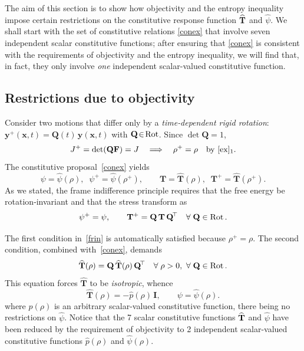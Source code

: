 The aim of this section is to show how objectivity and the entropy inequality impose
certain restrictions on the constitutive response function $\widehat{\mathbf{T}}$ and $\widehat{\psi}$. We shall start with the
set of constitutive relations \eqref{conex} that involve seven independent scalar constitutive functions; after ensuring that \eqref{conex}  is consistent with the requirements of objectivity and the entropy inequality, we will find that, in fact, they only involve \textit{one} independent scalar-valued
constitutive function.


\subsection{Restrictions due to objectivity}

Consider two motions that differ only by a
\emph{time‐dependent rigid rotation}:
\(\mathbf{y}^{+}(\mathbf{x},t) = \mathbf{Q}(t)\,\mathbf{y}(\mathbf{x},t)\)
with \(\mathbf{Q}\!\in\!\operatorname{Rot}\).
Since \(\det\mathbf{Q}=1\),
\[
J^{+} = \det(\mathbf{Q}\mathbf{F}) = J
\quad\Longrightarrow\quad
\rho^{+} = \rho
\quad\text{by \eqref{ex}\(_1\).}
\]
The constitutive proposal~\eqref{conex} yields
\begin{equation}
	\psi      = \widehat{\psi}(\rho), 
	\;\;
	\psi^{+}= \widehat{\psi}(\rho^{+}), 
	\qquad
	\mathbf{T}= \widehat{\mathbf{T}}(\rho), 
	\;\;
	\mathbf{T}^{+}= \widehat{\mathbf{T}}(\rho^{+}).
\end{equation}
As we stated, the frame indifference principle requires that the free energy be
rotation‐invariant and that the stress transform as 
\begin{equation}\label{frin}
	\psi^{+} = \psi,
	\qquad
	\mathbf{T}^{+} = \mathbf{Q}\,\mathbf{T}\,\mathbf{Q}^{\!\top}
	\quad
	\forall\;\mathbf{Q}\in\operatorname{Rot}.
\end{equation}





The first condition in~\eqref{frin} is automatically satisfied because
\(\rho^{+}=\rho\).
The second condition, combined with~\eqref{conex}, demands
\begin{equation}
	\widehat{\mathbf{T}}(\rho) =
	\mathbf{Q}\,\widehat{\mathbf{T}}(\rho)\,\mathbf{Q}^{\!\top}
	\quad
	\forall\;\rho>0,\ 
	\forall\;\mathbf{Q}\in\Rot.
\end{equation}
This equation forces \(\widehat{\mathbf{T}}\) to be
\emph{isotropic}, whence
\begin{equation}
\widehat{\mathbf{T}}(\rho)=-\widehat{p}(\rho)\,\mathbf{I}, \qquad \psi=\widehat{\psi}(\rho).
\end{equation}
where  \(\widehat{p}(\rho)\) is an arbitrary scalar-valued constitutive function, there being no restrictions on $\widehat{\psi}$. Notice that the 7 scalar constitutive functions
$\widehat{\mathbf{T}}$ and $\widehat{\psi}$ have been reduced by the requirement of objectivity to 2 independent scalar-valued constitutive functions  \(\widehat{p}(\rho)\) and $\widehat{\psi}(\rho)$.


